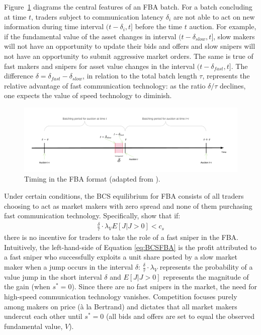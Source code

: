\documentclass[12pt]{article}
\begin{document}
Figure~\ref{fig:fbaDiagram} diagrams the central features of an FBA batch. For a batch concluding at time $t$, traders subject to communication latency $\delta_i$ are not able to act on new information during time interval $(t-\delta_i,t]$ before the time $t$ auction. For example, if the fundamental value of the asset changes in interval $(t-\delta_{slow},t]$, slow makers will not have an opportunity to update their bids and offers and slow snipers will not have an opportunity to submit aggressive market orders. The same is true of fast makers and snipers for asset value changes in the interval $(t-\delta_{fast},t]$. The difference $\delta = \delta_{fast}-\delta_{slow}$, in relation to the total batch length $\tau$, represents the relative advantage of fast communication technology: as the ratio $\delta/\tau$ declines, one expects the value of speed technology to diminish.

\begin{figure}
\centering
\includegraphics[width=\textwidth]{img/timing_FBA.png}
\caption{\label{fig:FBAtiming}Timing in the FBA format (adapted from \cite{Budish2015}).}
\label{fig:fbaDiagram}
\end{figure}

Under certain conditions, the BCS equilibrium for FBA consists of all traders choosing to act as market makers with zero spread and none of them purchasing fast communication technology. Specifically, \cite{Budish2015} show that if:
\begin{align} \label{eq:BCSFBA}
  \frac{\delta}{\tau} \cdot \lambda_V E\left[J | J>0\right] < c_s
\end{align}
there is no incentive for traders to take the role of a fast sniper in the FBA. Intuitively, the left-hand-side of Equation \eqref{eq:BCSFBA} is the profit attributed to a fast sniper who successfully exploits a unit share posted by a slow market maker when a jump occurs in the interval $\delta$: $\frac{\delta}{\tau} \cdot \lambda_V$ represents the probability of a value jump in the short interval $\delta$ and $E\left[J | J>0\right]$ represents the magnitude of the gain (when $s^*=0$). Since there are no fast snipers in the market, the need for high-speed communication technology vanishes.  Competition focuses purely among makers on price (à la Bertrand) and dictates that all market makers undercut each other until $s^* = 0$ (all bids and offers are set to equal the observed fundamental value, $V$). 
\end{document}
